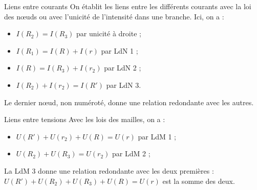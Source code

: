 \documentclass[../main/main.tex]{subfiles}
\begin{document}
\begin{tcbraster}[raster columns=2, raster equal height=rows]
    \begin{NCexem}{Liens entre courants}
        On établit les liens entre les différents courants avec la loi des nœuds
        ou avec l'unicité de l'intensité dans une branche. Ici, on a :
        \begin{itemize}
            \item $I(R_2) = I(R_3)$ par unicité à droite ;
            \item $I(R_1) = I(R) + I(r)$ par LdN 1 ;
            \item $I(R) = I(R_3) + I(r_2)$ par LdN 2 ;
            \item $I(R_2) + I(r_2) = I(R')$ par LdN 3.
        \end{itemize}
        Le dernier nœud, non numéroté, donne une relation redondante avec les
        autres.
    \end{NCexem}
    \begin{NCcexe}{Liens entre tensions}
        Avec les lois des mailles, on a :
        \begin{itemize}
            \item $U(R') + U(r_2) + U(R) = U(r)$ par LdM 1 ;
            \item $U(R_2) + U(R_3) = U(r_2)$ par LdM 2 ;
        \end{itemize}
        La LdM 3 donne une relation redondante avec les deux premières : $U(R')
        + U(R_2) + U(R_3) + U(R) = U(r)$ est la somme des deux.
    \end{NCcexe}
\end{tcbraster}
\end{document}
